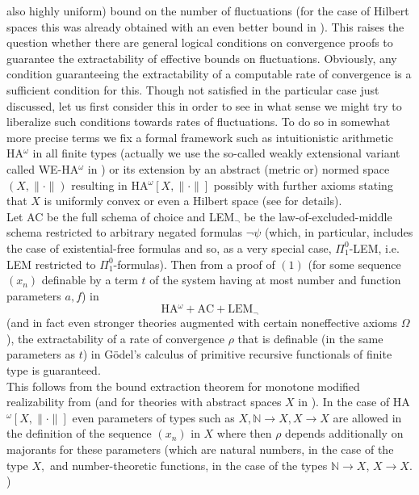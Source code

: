 \documentclass[1p]{elsarticle}
\newcommand{\NN}{\ensuremath{\mathbb{N}}}
\theoremstyle{plain}
\theoremstyle{definition}
\theoremstyle{remark}
\theoremstyle{definition}
\begin{document}
also highly uniform) 
bound on the number of fluctuations (for the case of Hilbert spaces this 
was already obtained with an even better bound in \cite{Jones}). This 
raises the question whether there are general logical conditions on 
convergence proofs to guarantee the extractability of effective bounds 
on fluctuations. Obviously, any condition guaranteeing the extractability of 
a computable rate of convergence is a sufficient condition for this. Though 
not satisfied in the particular case just discussed, let us first consider 
this in order to see in what sense we might try to liberalize such conditions 
towards rates of fluctuations. To do so in somewhat more precise 
terms we fix a formal framework such as intuitionistic arithmetic 
HA$^{\omega}$ in all finite types (actually we use the so-called weakly 
extensional variant called WE-HA$^{\omega}$ in \cite{Kohlenbach(book)}) 
or its extension by an abstract (metric or) 
normed space $(X,\|\cdot\|)$ resulting 
in HA$^{\omega}[X,\|\cdot\|]$ possibly with further axioms stating that 
$X$ is uniformly convex or even a Hilbert space (see \cite{Kohlenbach(book)} 
for details). \\ Let AC be the full schema of choice and 
LEM$_{\neg}$ be the law-of-excluded-middle schema restricted to arbitrary 
negated formulas $\neg\psi$ (which, in particular, includes the case 
of existential-free formulas and so, as a very special case, $\Pi^0_1$-LEM, 
i.e. LEM restricted to $\Pi^0_1$-formulas). Then from a proof of $(1)$ (for 
some sequence $(x_n)$ definable by a term $t$ of the system having at most 
number and function parameters $a,f$) in 
\[ \mbox{HA$^{\omega} +$AC$+$LEM}_{\neg} \] 
(and in fact even stronger theories augmented with certain noneffective 
axioms $\Omega$), the extractability of a rate of convergence $\rho$ that 
is definable (in the same parameters as $t$) in  
G\"odel's calculus of primitive recursive functionals of 
finite type is guaranteed.  \\ 
This follows from the bound extraction theorem for monotone modified 
realizability from \cite{Kohlenbach(relative),Kohlenbach(book)} 
(and for theories with abstract spaces $X$ in \cite{GerKoh06}). 
In the case of 
HA$^{\omega}[X,\| \cdot\|]$ even parameters of types such as $X, \NN\to X, 
X\to X$ are allowed in the definition of the sequence $(x_n)$ in $X$ where 
then $\rho$ depends additionally on majorants for these parameters (which are 
natural numbers, in the case of the type $X,$ and number-theoretic 
functions, in the case of the types $\NN\to X$, $X\to X.$) \\[2mm] 
\end{document}
